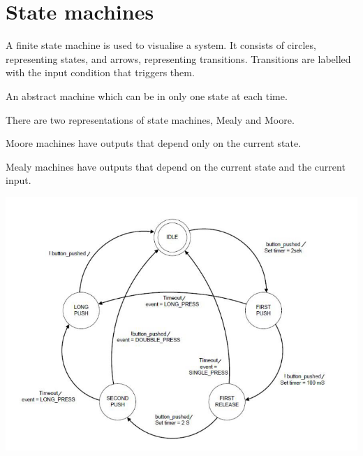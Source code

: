 \section{State machines}

A finite state machine is used to visualise a system.
It consists of circles, representing states, and arrows, representing transitions.
Transitions are labelled with the input condition that triggers them.

An abstract machine which can be in only one state at each time.

There are two representations of state machines, Mealy and Moore.

Moore machines have outputs that depend only on the current state.

Mealy machines have outputs that depend on the current state and the current input.


\begin{center}
	\includegraphics[width=\textwidth]{images/statemachine.png}
\end{center}
